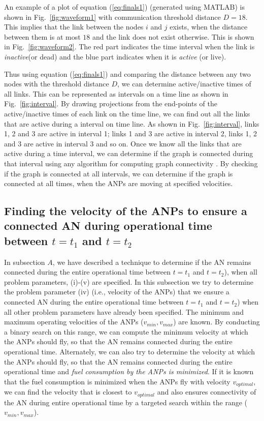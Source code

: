 \documentclass[10pt]{IEEEtran}
\begin{document}
An example of a plot of equation (\ref{eq:finals1}) (generated using MATLAB) is shown in Fig.~\ref{fig:waveform1} with  communication threshold distance $D =18$. This implies that the link between the nodes $i$ and $j$ exists, when the distance between them is at most $18$ and the link does not exist otherwise. This is shown in Fig.~\ref{fig:waveform2}. The red part indicates the time interval when the link is {\em inactive}(or dead) and the blue part indicates when it is {\em active} (or live). 

Thus using equation (\ref{eq:finals1})  and comparing the distance between any two nodes with the threshold distance $D$, we can determine active/inactive times of all links. This can be represented as intervals on a time line as shown in Fig.~\ref{fig:interval}.  By drawing projections from the end-points of the active/inactive times of each link on the time line, we can find out all the links that are active during a interval on time line. As shown in Fig.~\ref{fig:interval}, links 1, 2 and 3 are active in interval 1; links 1 and 3 are active in interval 2, links 1, 2 and 3 are active in interval 3 and so on. Once we know all the links that are active during a time interval, we can determine if the graph is connected during that interval using any algorithm for computing graph connectivity \cite{Diestel05}. By checking if the graph is connected at all intervals, we can determine if the graph is connected at all times, when the ANPs are moving at specified velocities.

\subsection {Finding the velocity of the ANPs to ensure a connected AN during operational time between $t = t_1$ and $t = t_2$}

In subsection $A$, we have described a technique to determine if the AN remains connected during the entire operational time between $t = t_1$ and $t = t_2$), when all problem parameters, (i)-(v) are specified. In this subsection we try to determine the problem parameter (iv) (i.e., velocity of the ANPs) that we ensure a connected AN during the entire operational time between $t = t_1$ and $t = t_2$) when all other problem parameters have already been specified. The minimum and maximum operating velocities of the ANPs ($v_{min}, v_{max}$) are known. By conducting a binary search on this range, we can compute the minimum velocity at which the ANPs should fly, so that the AN remains connected during the entire operational time. Alternately, we can also try to determine the velocity at which the ANPs should fly, so that the AN remains connected during the entire operational time and {\em fuel consumption by the ANPs is minimized}. If it is known that the fuel consumption is minimized when the ANPs fly with velocity $v_{optimal}$, we can find the velocity that is closest to $v_{optimal}$ and also ensures connectivity of the AN during entire operational time by a targeted search within the range ($v_{min}, v_{max}$). 
\end{document}
